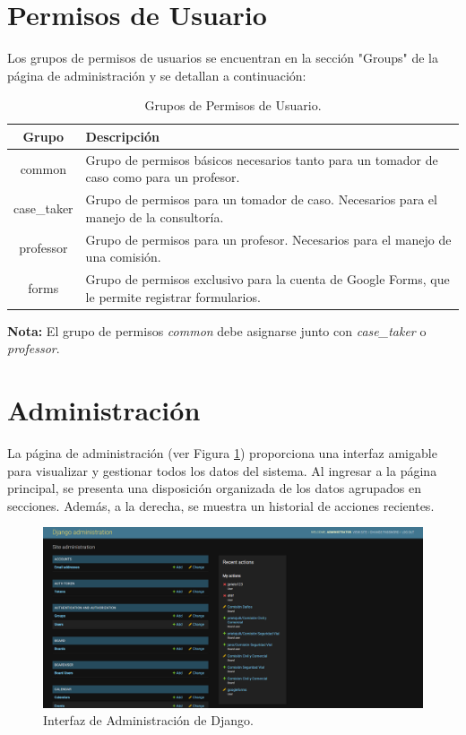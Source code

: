 \section{Permisos de Usuario}\label{sec:permisos-usuarios}

Los grupos de permisos de usuarios se encuentran en la sección "Groups" de la página de administración y se detallan a continuación:

\begin{table}[H]
    \centering
    \begin{tabular}{|c|p{10cm}|}
        \hline
        \textbf{Grupo} & \textbf{Descripción}\\
        \hline
        common & Grupo de permisos básicos necesarios tanto para un tomador de caso como para un profesor.\\
        \hline
        case_taker & Grupo de permisos para un tomador de caso. Necesarios para el manejo de la consultoría.\\
        \hline
        professor & Grupo de permisos para un profesor. Necesarios para el manejo de una comisión.\\
        \hline
        forms & Grupo de permisos exclusivo para la cuenta de Google Forms, que le permite registrar formularios.\\
        \hline
    \end{tabular}
    \caption{Grupos de Permisos de Usuario.}
    \label{tab:grupos-permisos-usuario}
\end{table}

\textbf{Nota:} El grupo de permisos \textit{common} debe asignarse junto con \textit{case\_taker} o \textit{professor}.


\section{Administración}\label{sec:administracion}

La página de administración (ver Figura \ref{fig:admin-interface}) proporciona una interfaz amigable para visualizar y gestionar todos los datos del sistema. Al ingresar a la página principal, se presenta una disposición organizada de los datos agrupados en secciones. Además, a la derecha, se muestra un historial de acciones recientes.

\begin{figure}[H]
    \centering
    \includegraphics[width=1\linewidth]{fig/administracion.png}
    \caption{Interfaz de Administración de Django.}
    \label{fig:admin-interface}
\end{figure}

